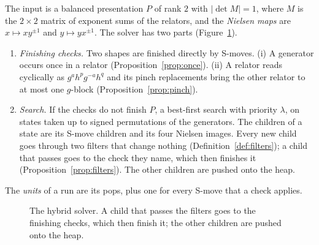 \begin{definition}\label{def:hybrid}
The input is a balanced presentation $P$ of rank $2$ with $|\det M|=1$, where $M$ is the $2\times2$ matrix of exponent
sums of the relators, and the \emph{Nielsen maps} are
$x\mapsto xy^{\pm1}$ and $y\mapsto yx^{\pm1}$. The solver has two parts (Figure~\ref{fig:hybrid}).
\begin{enumerate}
  \item \emph{Finishing checks.} Two shapes are finished directly by S-moves. (i) A generator occurs once in a relator
  (Proposition~\ref{prop:once}). (ii) A relator
  reads cyclically as $g^ah^pg^{-a}h^q$ and its pinch replacements bring the other relator to at most one $g$-block
  (Proposition~\ref{prop:pinch}).
  \item \emph{Search.} If the checks do not finish $P$, a best-first search with priority $\lambda$, on states taken
  up to signed permutations of the generators. The children of a state are its S-move children and its four Nielsen images. Every new child goes through two filters that change nothing
  (Definition~\ref{def:filters}); a child that passes goes to the check they name, which then finishes it
  (Proposition~\ref{prop:filters}). The other children are pushed onto the heap.
\end{enumerate}
The \emph{units} of a run are its pops, plus one for every S-move that a check applies.
\end{definition}

\begin{figure}[ht]
\centering
{}
\caption{The hybrid solver. A child that passes the filters goes to the finishing checks, which then finish it; the
other children are pushed onto the heap.}
\label{fig:hybrid}
\end{figure}

